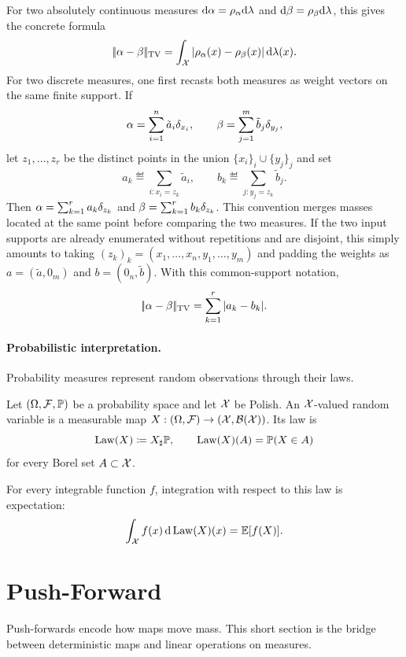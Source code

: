 For two absolutely continuous measures $\mathrm{d}\alpha=\rho_{\alpha}\mathrm{d}\lambda$ and $\mathrm{d}\beta=\rho_{\beta}\mathrm{d}\lambda$, this gives the concrete formula
\[
	|\!| \alpha-\beta |\!|_{\operatorname{TV}}
	=
	\int_{\mathcal{X}} |\rho_{\alpha}(x)-\rho_{\beta}(x)|\,\mathrm{d}\lambda(x).
\]
For two discrete measures, one first recasts both measures as weight vectors on
the same finite support. If
\[
	\alpha=\sum_{i=1}^n \tilde a_i\delta_{x_i},
	\qquad
	\beta=\sum_{j=1}^m \tilde b_j\delta_{y_j},
\]
let $z_1,\ldots,z_r$ be the distinct points in the union
$\{x_i\}_i\cup\{y_j\}_j$ and set
\[
	a_k\eqdef\sum_{i:x_i=z_k}\tilde a_i,
	\qquad
	b_k\eqdef\sum_{j:y_j=z_k}\tilde b_j.
\]
Then $\alpha=\sum_{k=1}^r a_k\delta_{z_k}$ and
$\beta=\sum_{k=1}^r b_k\delta_{z_k}$.
This convention merges masses located at the same point before comparing the two
measures. If the two input supports are already enumerated without repetitions
and are disjoint, this simply amounts to taking
$(z_k)_k=(x_1,\ldots,x_n,y_1,\ldots,y_m)$ and padding the weights as
$a=(\tilde a,0_m)$ and $b=(0_n,\tilde b)$. With this common-support notation,
\[
	|\!| \alpha-\beta |\!|_{\operatorname{TV}}
	=
	\sum_{k=1}^r |a_k-b_k|.
\]
\paragraph{Probabilistic interpretation.}

Probability measures represent random observations through their laws.
\begin{defn}\label{def-random-variable-law}
	Let $(\Omega,\mathcal{F},\mathbb{P})$ be a probability space and let $\mathcal{X}$ be Polish. An $\mathcal{X}$-valued random variable is a measurable map $X:(\Omega,\mathcal{F})\to(\mathcal{X},\mathcal{B}(\mathcal{X}))$. Its law is
	\[
		\operatorname{Law}(X)\coloneqq X_\sharp\mathbb{P},
		\qquad
		\operatorname{Law}(X)(A)=\mathbb{P}(X\in A)
	\]
	for every Borel set $A\subset\mathcal{X}$.
\end{defn}
For every integrable function $f$, integration with respect to this law is expectation:
\[
	\int_{\mathcal{X}} f(x)\,\mathrm{d}\operatorname{Law}(X)(x)=\mathbb{E}[f(X)].
\]


\section{Push-Forward}
\label{sec-push-forward}


Push-forwards encode how maps move mass. This short section is the bridge between deterministic maps and linear operations on measures.

